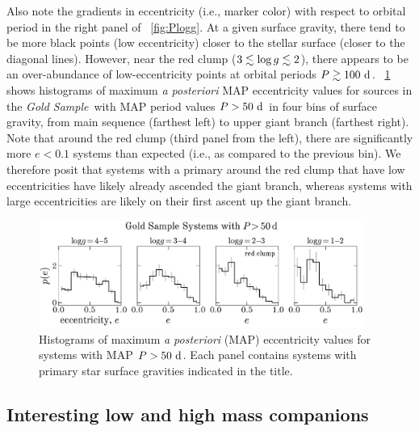 \documentclass[modern]{aastex63}
\newcommand{\goldsample}{\textit{Gold Sample}}
\begin{document}
Also note the gradients in eccentricity (i.e., marker color) with respect to
orbital period in the right panel of \figurename~\ref{fig:Plogg}.
At a given surface gravity, there tend to be more black points (low
eccentricity) closer to the stellar surface (closer to the diagonal lines).
However, near the red clump ($3 \lesssim \log g \lesssim 2$), there appears to be
an over-abundance of low-eccentricity points at orbital periods $P\gtrsim
100~\mathrm{d}$.
\figurename~\ref{fig:Pe-logg-bins} shows histograms of maximum \textsl{a
posteriori} MAP eccentricity values for sources in the \goldsample\ with MAP
period values $P > 50~\mathrm{d}$ in four bins of surface gravity, from main sequence
(farthest left) to upper giant branch (farthest right).
Note that around the red clump (third panel from the left), there are
significantly more $e < 0.1$ systems than expected (i.e., as compared to the
previous bin).
We therefore posit that systems with a primary around the red clump that have
low eccentricities have likely already ascended the giant branch, whereas
systems with large eccentricities are likely on their first ascent up the giant
branch.

\begin{figure}[t]
    \begin{center}
    \includegraphics[width=0.95\textwidth]{P_e_logg_bins.pdf}
    \end{center}
    \caption{%
    Histograms of maximum \textsl{a posteriori} (MAP) eccentricity values for
    systems with MAP $P > 50~\mathrm{d}$.
    Each panel contains systems with primary star surface gravities indicated in
    the title.
    \label{fig:Pe-logg-bins}
    }
\end{figure}


\subsection{Interesting low and high mass companions}
\label{sec:low-high-mass}
\end{document}
